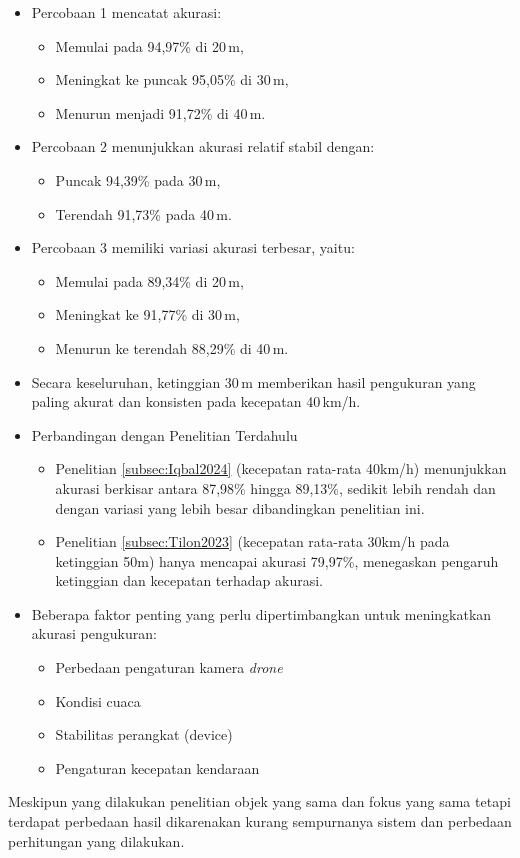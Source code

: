 \begin{itemize}[nolistsep]
  \item Percobaan 1 mencatat akurasi:
    \begin{itemize}[nolistsep]
      \item Memulai pada 94,97\% di 20\,m,
      \item Meningkat ke puncak 95,05\% di 30\,m,
      \item Menurun menjadi 91,72\% di 40\,m.
    \end{itemize}
  \item Percobaan 2 menunjukkan akurasi relatif stabil dengan:
    \begin{itemize}[nolistsep]
      \item Puncak 94,39\% pada 30\,m,
      \item Terendah 91,73\% pada 40\,m.
    \end{itemize}
  \item Percobaan 3 memiliki variasi akurasi terbesar, yaitu:
    \begin{itemize}[nolistsep]
      \item Memulai pada 89,34\% di 20\,m,
      \item Meningkat ke 91,77\% di 30\,m,
      \item Menurun ke terendah 88,29\% di 40\,m.
    \end{itemize}

  \item Secara keseluruhan, ketinggian 30\,m memberikan hasil pengukuran yang paling akurat dan konsisten pada kecepatan 40\,km/h.

  \item Perbandingan dengan Penelitian Terdahulu
	\begin{itemize}[nolistsep]
	\item Penelitian \ref{subsec:Iqbal2024} (kecepatan rata-rata 40km/h) menunjukkan akurasi berkisar antara 87,98\% hingga 89,13\%, sedikit lebih rendah dan dengan variasi yang lebih besar dibandingkan penelitian ini.
	\item Penelitian \ref{subsec:Tilon2023} (kecepatan rata-rata 30km/h pada ketinggian 50m) hanya mencapai akurasi 79,97\%, menegaskan pengaruh ketinggian dan kecepatan terhadap akurasi.
	\end{itemize}
	\item Beberapa faktor penting yang perlu dipertimbangkan untuk meningkatkan akurasi pengukuran:
	\begin{itemize}[nolistsep]
	\item Perbedaan pengaturan kamera \emph{drone}
	\item Kondisi cuaca
	\item Stabilitas perangkat (device)
	\item Pengaturan kecepatan kendaraan
	\end{itemize}
\end{itemize}
Meskipun yang dilakukan penelitian objek yang sama dan fokus yang sama tetapi terdapat perbedaan hasil dikarenakan kurang sempurnanya sistem dan perbedaan perhitungan yang dilakukan.
\vspace{10ex}
